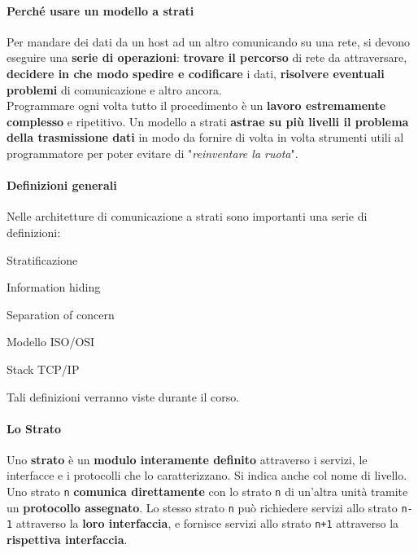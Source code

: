 \documentclass[10pt]{article}
\begin{document}
\paragraph{Perché usare un modello a strati} Per mandare dei dati da un host ad un altro comunicando su una rete, si devono eseguire una \textbf{serie di operazioni}: \textbf{trovare il percorso} di rete da attraversare, \textbf{decidere in che modo spedire e codificare} i dati, \textbf{risolvere eventuali problemi} di comunicazione e altro ancora.\\
Programmare ogni volta tutto il procedimento è un \textbf{lavoro estremamente complesso} e ripetitivo. Un modello a strati \textbf{astrae su più livelli il problema della trasmissione dati} in modo da fornire di volta in volta strumenti utili al programmatore per poter evitare di "\textit{reinventare la ruota}".
\paragraph{Definizioni generali} Nelle architetture di comunicazione a strati sono importanti una serie di definizioni:
\begin{list}{-}{}
\item Stratificazione
\item Information hiding
\item Separation of concern
\item Modello ISO/OSI
\item Stack TCP/IP
\end{list}
Tali definizioni verranno viste durante il corso.
\paragraph{Lo Strato} Uno \textbf{strato} è un \textbf{modulo interamente definito} attraverso i servizi, le interfacce e i protocolli che lo caratterizzano. Si indica anche col nome di livello.\\
Uno strato \texttt{n} \textbf{comunica direttamente} con lo strato \texttt{n} di un'altra unità tramite un \textbf{protocollo assegnato}. Lo stesso strato \texttt{n} può richiedere servizi allo strato \texttt{n-1} attraverso la \textbf{loro interfaccia}, e fornisce servizi allo strato \texttt{n+1} attraverso la \textbf{rispettiva interfaccia}.
\end{document}

